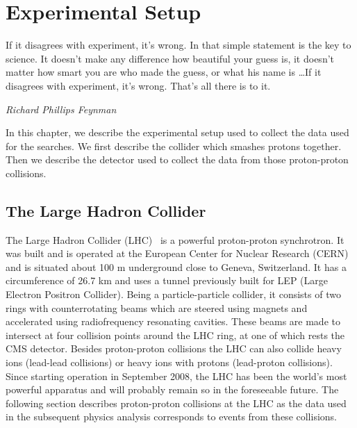 \chapter{Experimental Setup}
\label{chap:exper_setup}
\epigraph{If it disagrees with experiment, it’s wrong. In that simple statement is the key to science. It doesn’t make any difference how beautiful your guess is, it doesn’t matter how smart you are who made the guess, or what his name is \ldots  If it disagrees with experiment, it’s wrong. That’s all there is to it.}{\textit{Richard Phillips Feynman}}
In this chapter, we describe the experimental setup used to collect the data used for the searches. We first describe the collider which smashes protons together. Then we describe the detector used to collect the data from those proton-proton collisions.
\section{The Large Hadron Collider}
\label{sec:LHC}

The Large Hadron Collider (LHC)~\cite{lhcmachine} is a powerful proton-proton synchrotron. It was built and is operated at the European Center for Nuclear Research (CERN) and is situated about 100 m underground close to Geneva, Switzerland. It has a circumference of 26.7 km and uses a tunnel previously built for LEP (Large Electron Positron Collider). Being a particle-particle collider, it consists of two rings with counterrotating beams which are steered using magnets and accelerated using radiofrequency resonating cavities. These beams are made to intersect at four collision points around the LHC ring, at one of which rests the CMS detector. Besides proton-proton collisions the LHC can also collide heavy ions (lead-lead collisions) or heavy ions with protons (lead-proton collisions). Since starting operation in September 2008, the LHC has been the world's most powerful apparatus and will probably remain so in the foreseeable future. The following section describes proton-proton collisions at the LHC as the data used in the subsequent physics analysis corresponds to events from these collisions.

